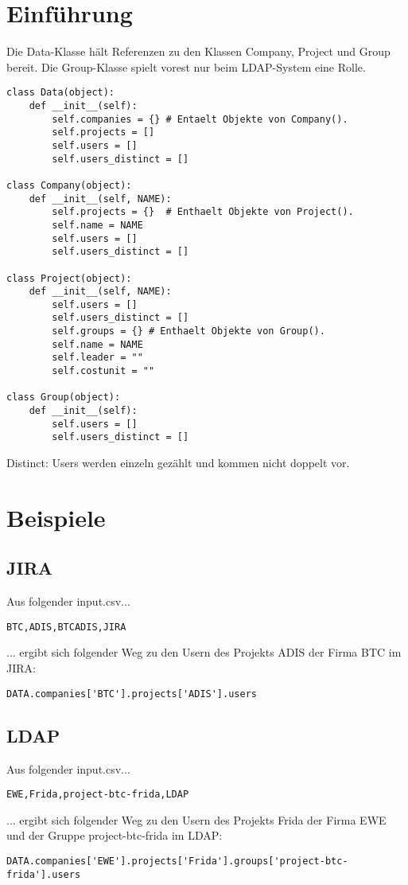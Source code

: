 \documentclass[a4paper,12pt]{report}
\begin{document}
	\section{Einführung}
	Die Data-Klasse hält Referenzen zu den Klassen Company, Project und Group bereit. Die Group-Klasse spielt vorest nur beim LDAP-System eine Rolle.
		\begin{lstlisting}
class Data(object):
    def __init__(self):
        self.companies = {} # Entaelt Objekte von Company().
        self.projects = []
        self.users = []
        self.users_distinct = []

class Company(object):
    def __init__(self, NAME):
        self.projects = {}  # Enthaelt Objekte von Project().
        self.name = NAME
        self.users = []
        self.users_distinct = []

class Project(object):
    def __init__(self, NAME):
        self.users = []
        self.users_distinct = []
        self.groups = {} # Enthaelt Objekte von Group().
        self.name = NAME
        self.leader = ""
        self.costunit = ""

class Group(object):
    def __init__(self):
        self.users = []
        self.users_distinct = []
	\end{lstlisting}
	{\footnotesize Distinct: Users werden einzeln gezählt und kommen nicht doppelt} vor. 	
	
	\section{Beispiele}
	\subsection{JIRA}
	Aus folgender input.csv...
	\begin{lstlisting}
BTC,ADIS,BTCADIS,JIRA
	\end{lstlisting}
    ... ergibt sich folgender Weg zu den Usern des Projekts ADIS der Firma BTC im JIRA:
    \begin{lstlisting}
DATA.companies['BTC'].projects['ADIS'].users
	\end{lstlisting}
   
	\subsection{LDAP}
	Aus folgender input.csv...
	\begin{lstlisting}
EWE,Frida,project-btc-frida,LDAP
	\end{lstlisting}
    ... ergibt sich folgender Weg zu den Usern des Projekts Frida der Firma EWE und der Gruppe project-btc-frida im LDAP:
    \begin{lstlisting}
DATA.companies['EWE'].projects['Frida'].groups['project-btc-frida'].users
	\end{lstlisting}
	\newpage	
	
\end{document}
